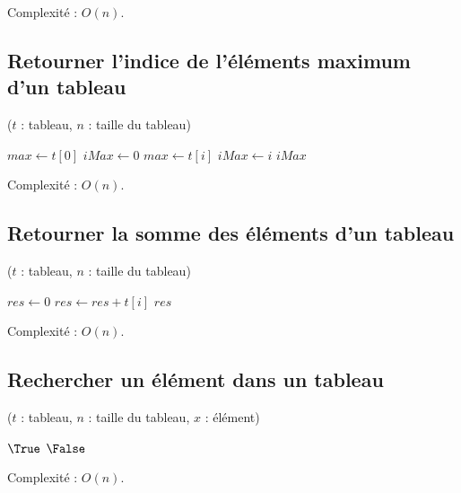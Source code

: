 Complexité : $O(n)$.


\subsection{Retourner l'indice de l'éléments maximum d'un tableau}
\begin{algorithm}[H]
\caption{ ($t$ : tableau, $n$ : taille du tableau)}
\begin{algorithmic}[1]
\State {}
\State $max \gets t[0]$ 
\State $iMax \gets 0$ 
		\State $max \gets t[i]$
		\State $iMax \gets i$
	\EndIf
\EndFor
\State\Return $iMax$
\end{algorithmic}
\end{algorithm}

Complexité : $O(n)$.


\subsection{Retourner la somme des éléments d'un tableau}
\begin{algorithm}[H]
\caption{ ($t$ : tableau, $n$ : taille du tableau)}
\begin{algorithmic}[1]
\State $res \gets 0$ 
	\State $res \gets res + t[i]$
\EndFor
\State\Return $res$
\end{algorithmic}
\end{algorithm}

Complexité : $O(n)$.


\subsection{Rechercher un élément dans un tableau}
\begin{algorithm}[H]
\caption{ ($t$ : tableau, $n$ : taille du tableau, $x$ : élément)}
\begin{algorithmic}[1]
		\State\Return $\True$
	\EndIf
\EndFor
\State\Return $\False$
\end{algorithmic}
\end{algorithm}

Complexité : $O(n)$.
